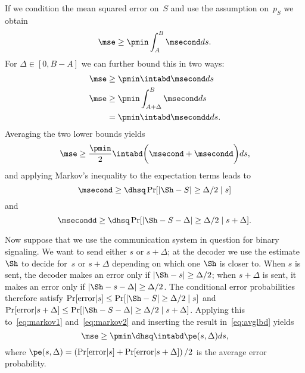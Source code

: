 \begin{subappendices}
  If we condition the mean squared error on~$S$ and use the assumption on~$p_S$
  we obtain
  \begin{equation*}
    \mse \ge \pmin \int_A^B \msecond ds.
  \end{equation*}
  For $\Delta \in [0, B-A]$ we can further bound this in two ways:
  \begin{align*}
    \mse &\ge \pmin \intabd \msecond ds \\
    \mse &\ge \pmin \int_{A+\Delta}^B \msecond ds \\
    &= \pmin \intabd \msecondd ds.
  \end{align*}
  Averaging the two lower bounds yields
  \begin{equation}
    \label{eq:avglbd}
    \mse \ge \frac{\pmin}{2} \intabd \bigg( \msecond + \\
    \msecondd \bigg) ds,
  \end{equation}
  and applying Markov's inequality to the expectation terms leads to
  \begin{equation}
    \label{eq:markov1}
    \msecond \ge \dhsq \Pr[|\Sh - S| \ge \Delta/2 \mid s]
  \end{equation}
  and
  \begin{equation}
    \label{eq:markov2}
    \msecondd \\
    \ge \dhsq \Pr[|\Sh - S - \Delta| \ge \Delta/2 \mid s+\Delta].
  \end{equation}

  Now suppose that we use the communication system in question for binary
  signaling. We want to send either $s$ or $s+\Delta$; at the decoder we use the
  estimate~$\Sh$ to decide for~$s$ or $s + \Delta$ depending on which one $\Sh$
  is closer to. When $s$ is sent, the decoder makes an error only if $|\Sh - s|
  \ge \Delta/2$; when $s + \Delta$ is sent, it makes an error only if $|\Sh - s
  - \Delta| \ge \Delta/2$. The conditional error probabilities therefore satisfy
  $\Pr[\text{error} | s] \le \Pr[|\Sh - S| \ge \Delta/2 \mid s]$ and
  $\Pr[\text{error} | s + \Delta] \le \Pr[|\Sh - S - \Delta| \ge \Delta/2 \mid s +
  \Delta]$. Applying this to~\eqref{eq:markov1} and~\eqref{eq:markov2} and
  inserting the result in~\eqref{eq:avglbd} yields
  \begin{equation}
    \label{eq:zivalmostproved}
    \mse \ge \pmin \dhsq \intabd \pe(s, \Delta) ds,
  \end{equation}
  where $\pe(s, \Delta) = \left(\Pr[\text{error}|s] + \Pr[\text{error}|s +
  \Delta] \right)/2$ is the average error probability.


\end{subappendices}
